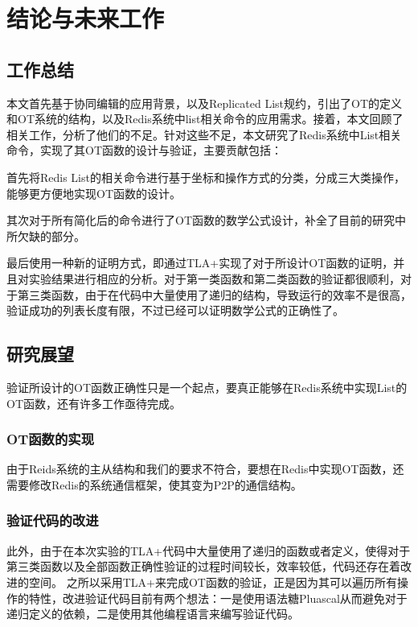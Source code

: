 \chapter{结论与未来工作}
\section{工作总结}
\par 本文首先基于协同编辑的应用背景，以及Replicated List规约，引出了OT的定义和OT系统的结构，以及Redis系统中list相关命令的应用需求。接着，本文回顾了相关工作，分析了他们的不足。针对这些不足，本文研究了Redis系统中List相关命令，实现了其OT函数的设计与验证，主要贡献包括：
\par 首先将Redis List的相关命令进行基于坐标和操作方式的分类，分成三大类操作，能够更方便地实现OT函数的设计。
\par 其次对于所有简化后的命令进行了OT函数的数学公式设计，补全了目前的研究中所欠缺的部分。
\par 最后使用一种新的证明方式，即通过TLA+实现了对于所设计OT函数的证明，并且对实验结果进行相应的分析。对于第一类函数和第二类函数的验证都很顺利，对于第三类函数，由于在代码中大量使用了递归的结构，导致运行的效率不是很高，验证成功的列表长度有限，不过已经可以证明数学公式的正确性了。
\section{研究展望}
验证所设计的OT函数正确性只是一个起点，要真正能够在Redis系统中实现List的OT函数，还有许多工作亟待完成。
\subsection{OT函数的实现}
由于Reids系统的主从结构和我们的要求不符合，要想在Redis中实现OT函数，还需要修改Redis的系统通信框架，使其变为P2P的通信结构。
\subsection{验证代码的改进}
此外，由于在本次实验的TLA+代码中大量使用了递归的函数或者定义，使得对于第三类函数以及全部函数正确性验证的过程时间较长，效率较低，代码还存在着改进的空间。
之所以采用TLA+来完成OT函数的验证，正是因为其可以遍历所有操作的特性，改进验证代码目前有两个想法：一是使用语法糖Pluascal从而避免对于递归定义的依赖，二是使用其他编程语言来编写验证代码。